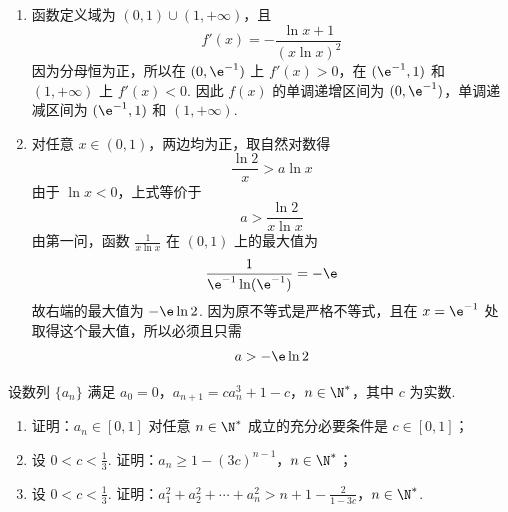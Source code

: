 \begin{solution}
\begin{enumerate}
\item
函数定义域为 \((0,1)\cup(1,+\infty)\)，且
\[
f'(x)=-\frac{\ln x+1}{(x\ln x)^2}
\]
因为分母恒为正，所以在 \((0,\e^{-1})\) 上 \(f'(x)>0\)，在 \((\e^{-1},1)\) 和 \((1,+\infty)\) 上 \(f'(x)<0\). 因此 \(f(x)\) 的单调递增区间为 \((0,\e^{-1})\)，单调递减区间为 \((\e^{-1},1)\) 和 \((1,+\infty)\).

\item
对任意 \(x\in(0,1)\)，两边均为正，取自然对数得
\[
\frac{\ln2}{x}>a\ln x
\]
由于 \(\ln x<0\)，上式等价于
\[
a>\frac{\ln2}{x\ln x}
\]
由第一问，函数 \(\frac{1}{x\ln x}\) 在 \((0,1)\) 上的最大值为
\[
\frac{1}{\e^{-1}\ln(\e^{-1})}=-\e
\]
故右端的最大值为 \(-\e\ln2\). 因为原不等式是严格不等式，且在 \(x=\e^{-1}\) 处取得这个最大值，所以必须且只需
\[
a>-\e\ln2
\]
\end{enumerate}
\end{solution}

\begin{problem}
设数列 \(\{a_{n}\}\) 满足 \(a_0 = 0\)，\(a_{n+1} = c a_n^3 + 1 - c\)，\(n \in \N^*\)，其中 \(c\) 为实数.

\begin{enumerate}
\item 证明：\(a_{n} \in [0,1]\) 对任意 \(n \in \N^*\) 成立的充分必要条件是 \(c \in [0,1]\)；
\item 设 \(0 < c < \frac{1}{3}\). 证明：\(a_{n} \geqslant 1 - (3c)^{n-1}\)，\(n \in \N^*\)；
\item 设 \(0 < c < \frac{1}{3}\). 证明：\(a_1^2 + a_2^2 + \cdots + a_n^2 > n + 1 - \frac{2}{1 - 3c}\)，\(n \in \N^*\).
\end{enumerate}
\end{problem}

